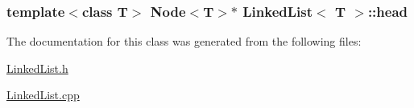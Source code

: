 \subsubsection[{\texorpdfstring{head}{head}}]{\setlength{\rightskip}{0pt plus 5cm}template$<$class T$>$ {\bf Node}$<$T$>$$\ast$ {\bf Linked\+List}$<$ T $>$\+::head\hspace{0.3cm}{\ttfamily [protected]}}\hypertarget{classLinkedList_a35e09287e2d2943707b011208e7a8ed2}{}\label{classLinkedList_a35e09287e2d2943707b011208e7a8ed2}


The documentation for this class was generated from the following files\+:\begin{DoxyCompactItemize}
\item 
\hyperlink{LinkedList_8h}{Linked\+List.\+h}\item 
\hyperlink{LinkedList_8cpp}{Linked\+List.\+cpp}\end{DoxyCompactItemize}
